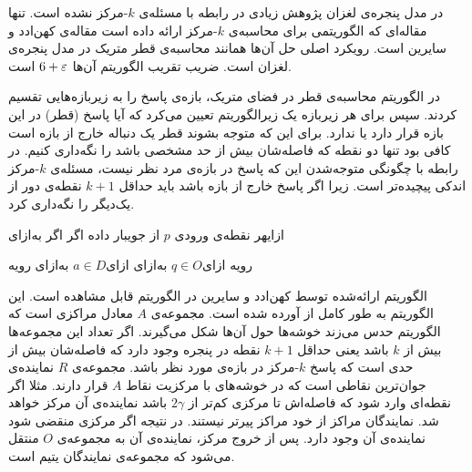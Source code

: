 در مدل پنجره‌ی لغزان پژوهش زیادی در رابطه با مسئله‌ی $k$-مرکز نشده است. تنها مقاله‌ای که الگوریتمی برای محاسبه‌ی $k$-مرکز ارائه داده است مقاله‌ی کهن‌ادد و سایرین  است. رویکرد اصلی حل آن‌ها همانند محاسبه‌ی قطر متریک در مدل پنجره‌ی لغزان است. ضریب تقریب الگوریتم آن‌ها $6+\varepsilon$ است.

در الگوریتم محاسبه‌ی قطر در فضای متریک، بازه‌ی پاسخ را به زیربازه‌هایی تقسیم کردند. سپس برای هر زیربازه یک زیرالگوریتم تعیین می‌کرد که آیا پاسخ (قطر) در این بازه قرار دارد یا ندارد. برای این که متوجه بشوند قطر یک دنباله خارج از بازه است کافی بود تنها دو نقطه که فاصله‌‌شان بیش از حد مشخصی باشد را نگه‌داری کنیم. در رابطه با چگونگی متوجه‌شدن این که پاسخ در بازه‌ی مرد نظر نیست، مسئله‌ی $k$-مرکز اندکی پیچیده‌تر است. زیرا اگر پاسخ خارج از بازه باشد باید حداقل $k+1$ نقطه‌ی دور از یک‌دیگر را نگه‌داری کرد. 

‌ازای{هر نقطه‌ی ورودی $p$ از جویبار داده}
‌اگر{}
‌اگر{}
‌به‌ازای{}


‌رویه{}
\EndIf{}
‌ازای{$q \in O$}
\EndIf{}
‌به‌ازای{}
\EndIf{}
\Else{}
‌ازای{$a \in D$}
‌به‌ازای{}
\EndIf{}
‌رویه{}



الگوریتم ارائه‌شده توسط کهن‌ادد و سایرین در الگوریتم  قابل مشاهده است. این الگوریتم به طور کامل از   آورده شده است. مجموعه‌ی $A$ معادل مراکزی است که الگوریتم حدس می‌زند خوشه‌ها حول آن‌ها شکل می‌گیرند. اگر تعداد این مجموعه‌ها بیش از $k$ باشد یعنی حداقل $k+1$ نقطه در پنجره وجود دارد که فاصله‌شان بیش از حدی است که پاسخ $k$-مرکز در بازه‌ی مورد نظر باشد. مجموعه‌ی $R$ نماینده‌ی جوان‌ترین نقاطی است که در خوشه‌های با مرکزیت نقاط $A$ قرار دارند. مثلا اگر نقطه‌ای وارد شود که فاصله‌اش تا مرکزی کم‌تر از $2 \gamma$ باشد نماینده‌ی آن مرکز خواهد شد. نمایندگان مراکز از خود مراکز پیرتر نیستند. در نتیجه اگر مرکزی منقضی شود نماینده‌ی آن وجود دارد. پس از خروج مرکز، نماینده‌ی آن به مجموعه‌ی $O$ منتقل می‌شود که مجموعه‌ی نمایندگان یتیم  است.
 
